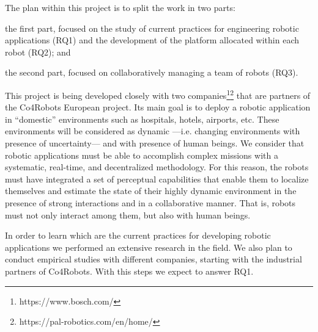 The plan within this project is to split the work in two parts:
\begin{enumerate*}
\item the first part, focused on the study of current practices for engineering robotic applications (RQ1) and the development of the platform allocated within each robot (RQ2); and
\item the second part, focused on collaboratively managing a team of robots (RQ3).
\end{enumerate*}

This project is being developed closely with two companies\footnote{https://www.bosch.com/}\footnote{https://pal-robotics.com/en/home/} that are partners of the Co4Robots European project.
Its main goal is to deploy a robotic application in ``domestic'' environments such as hospitals, hotels, airports, etc.
These environments will be considered as dynamic ---i.e. changing environments with presence of uncertainty--- and with presence of human beings.
We consider that robotic applications must be able to accomplish complex missions with a systematic, real-time, and decentralized methodology.
For this reason, the robots must have integrated a set of perceptual capabilities that enable them to localize themselves and estimate the state of their highly dynamic environment in the presence of strong interactions and in a collaborative manner.
That is, robots must not only interact among them, but also with human beings.

In order to learn which are the current practices for developing robotic applications we performed an extensive research in the field.
We also plan to conduct empirical studies with different companies, starting with the industrial partners of Co4Robots.
With this steps we expect to answer RQ1. %




